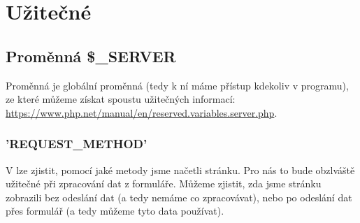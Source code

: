 \section{Užitečné}


\subsection{Proměnná \$\_SERVER}
Proměnná  je globální proměnná (tedy k ní máme přístup kdekoliv v programu), ze které můžeme získat spoustu užitečných informací: \url{https://www.php.net/manual/en/reserved.variables.server.php}.

\subsubsection{'REQUEST\_METHOD'}
V  lze zjistit, pomocí jaké metody jsme načetli stránku. Pro nás to bude obzlváště užitečné při zpracování dat z formuláře. Můžeme zjistit, zda jsme stránku zobrazili bez odeslání dat (a tedy nemáme co zpracovávat), nebo po odeslání dat přes formulář (a tedy můžeme tyto data používat). \\

